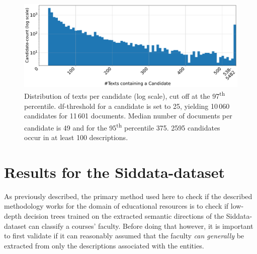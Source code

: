 \begin{figure}[H]
	\centering
	\includegraphics[width=\figwidth]{graphics/dataset_new/docs_per_phrase.pdf}
	\caption[Distribution of texts per candidate]{Distribution of texts per candidate (log scale), cut off at the 97\textsuperscript{th} percentile. \Gls{df}-threshold for a candidate is set to 25, yielding 10\,060 candidates for 11\,601 documents. Median number of documents per candidate is 49 and for the 95\textsuperscript{th} percentile 375. 2595 candidates occur in at least 100 descriptions.}
	\label{fig:candidate_histogram}
\end{figure}


\section{Results for the Siddata-dataset}
\label{sec:results_siddata}


As previously described, the primary method used here to check if the described methodology works for the domain of educational resources is to check if low-depth decision trees trained on the extracted semantic directions of the Siddata-dataset can classify a courses' faculty. Before doing that however, it is important to first validate if it can reasonably assumed that the faculty \textit{can generally} be extracted from only the descriptions associated with the entities.

